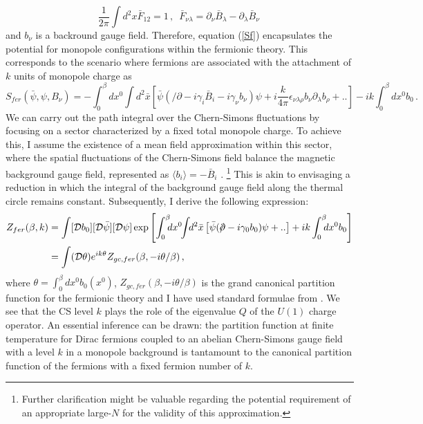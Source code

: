 \documentclass[twoside]{article}
\begin{document}
\begin{equation}
\label{monopole}
\frac{1}{2\pi}\int d^2x \bar{F}_{12}=1\,,\,\,\,\bar{F}_{\nu\lambda}=\partial_\nu \bar{B}_\lambda-\partial_\lambda \bar{B}_\nu\,
\end{equation}
and $b_\nu$ is a backround gauge field.
Therefore, equation (\ref{Sf}) encapsulates the potential for monopole configurations within the fermionic theory. This corresponds to the scenario where fermions are associated with the attachment of $k$ units of monopole charge as
\begin{equation}
\label{Sfexp}
S_{fer}(\bar\psi,\psi,B_\nu) =-\int_0^\beta \!\!\!dx^0\!\!\int \!\!d^2\bar{x}\left[\bar\psi(\slash\!\!\!\partial-i\gamma_i\bar{B}_i-i\gamma_\nu b_\nu)\psi+i\frac{k}{4\pi}\epsilon_{\nu\lambda\rho}b_\nu\partial_\lambda b_{\rho}+..\right]-ik\int_0^\beta \!\!\!dx^0 b_0\,.
\end{equation}
We can carry out the path integral over the Chern-Simons fluctuations by focusing on a sector characterized by a fixed total monopole charge. To achieve this, I assume the existence of a mean field approximation within this sector, where the spatial fluctuations of the Chern-Simons field balance the magnetic background gauge field, represented as $\langle b_i\rangle =-\bar{B}_i$ \cite{Barkeshli:2014ida}. \footnote{ Further clarification might be valuable regarding the potential requirement of an appropriate large-$N$ for the validity of this approximation.} This is akin to envisaging a reduction in which the integral of the background gauge field along the thermal circle remains constant. Subsequently, I derive the following expression:
\begin{align}
Z_{fer}(\beta,k)&=\int [{\cal D} b_0][{\cal D}\bar\psi][{\cal D}\psi]\exp{\left[\int_0^\beta \!\!\!dx^0 \!\!\int \!\!d^2\bar{x}\left[\bar\psi(\slash\!\!\!\partial-i\gamma_0 b_0)\psi+..\right]+ik\int_0^\beta \!\!\!dx^0 b_0\right]}\nonumber \\
\label{DiracCSPFfin}
&=\int ({\cal D}\theta)e^{ik\theta}Z_{gc,fer}(\beta,-i\theta/\beta)\,,
\end{align}
where  $\theta=\int_0^\beta dx^0 b_0(x^0)$, $Z_{gc,fer}(\beta,-i\theta/\beta)$ is the grand canonical partition function for the fermionic theory and I have used standard formulae from \cite{ZinnJustin:2002ru}. We see that the CS level $k$ plays the role of the eigenvalue $Q$ of the $U(1)$ charge operator. 
An essential inference can be drawn: the partition function at finite temperature for Dirac fermions coupled to an abelian Chern-Simons gauge field with a level $k$ in a monopole background is tantamount to the canonical partition function of the fermions with a fixed fermion number of $k$.
\end{document}
